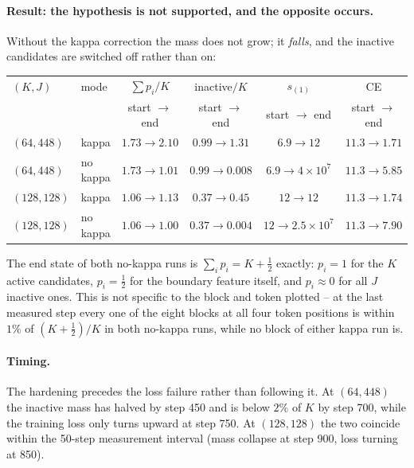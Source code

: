 \documentclass[11pt,a4paper]{article}
\begin{document}
\paragraph{Result: the hypothesis is not supported, and the opposite occurs.}
Without the kappa correction the mass does not grow; it \emph{falls}, and the
inactive candidates are switched off rather than on:

\begin{center}\small
\begin{tabular}{llcccc}
\toprule
$(K,J)$ & mode & $\sum p_i/K$ & inactive$/K$ & $s_{(1)}$ & CE \\
 & & start $\to$ end & start $\to$ end & start $\to$ end & start $\to$ end \\
\midrule
$(64,448)$  & kappa    & $1.73 \to 2.10$ & $0.99 \to 1.31$  & $6.9 \to 12$   & $11.3 \to 1.71$ \\
$(64,448)$  & no kappa & $1.73 \to 1.01$ & $0.99 \to 0.008$ & $6.9 \to 4\times10^{7}$ & $11.3 \to 5.85$ \\
$(128,128)$ & kappa    & $1.06 \to 1.13$ & $0.37 \to 0.45$  & $12 \to 12$    & $11.3 \to 1.74$ \\
$(128,128)$ & no kappa & $1.06 \to 1.00$ & $0.37 \to 0.004$ & $12 \to 2.5\times10^{7}$ & $11.3 \to 7.90$ \\
\bottomrule
\end{tabular}
\end{center}

The end state of both no-kappa runs is $\sum_i p_i = K + \tfrac12$ exactly:
$p_i = 1$ for the $K$ active candidates, $p_i = \tfrac12$ for the boundary
feature itself, and $p_i \approx 0$ for all $J$ inactive ones. This is not
specific to the block and token plotted -- at the last measured step every
one of the eight blocks at all four token positions is within $1\%$ of
$(K+\tfrac12)/K$ in both no-kappa runs, while no block of either kappa run is.

\paragraph{Timing.}
The hardening precedes the loss failure rather than following it. At
$(64,448)$ the inactive mass has halved by step 450 and is below $2\%$ of $K$
by step 700, while the training loss only turns upward at step 750. At
$(128,128)$ the two coincide within the 50-step measurement interval (mass
collapse at step 900, loss turning at 850).
\end{document}
